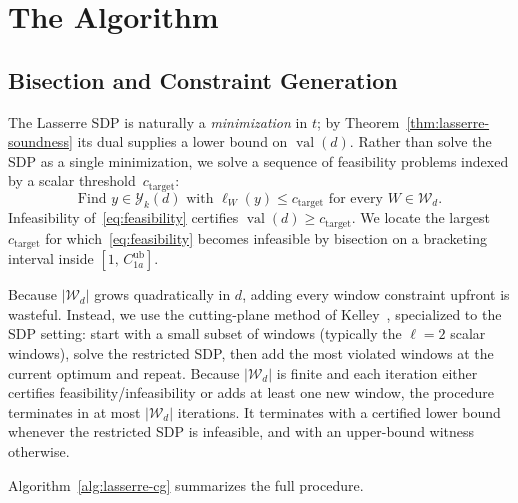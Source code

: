 \documentclass[11pt, letterpaper]{article}
\theoremstyle{paperplain}
\theoremstyle{paperdef}
\newcommand{\val}{\operatorname{val}}
\begin{document}
\section{The Algorithm}\label{sec:algorithm}

\subsection{Bisection and Constraint Generation}

The Lasserre SDP is naturally a \emph{minimization} in $t$; by
Theorem~\ref{thm:lasserre-soundness} its dual supplies a lower bound
on $\val(d)$.  Rather than solve the SDP as a single minimization, we
solve a sequence of feasibility problems indexed by a scalar
threshold~$c_{\mathrm{target}}$:
\begin{equation}\label{eq:feasibility}
  \text{Find } y\in\mathcal{Y}_k(d)\text{ with }
  \ell_W(y) \le c_{\mathrm{target}}\text{ for every }W\in\mathcal{W}_d.
\end{equation}
Infeasibility of~\eqref{eq:feasibility} certifies
$\val(d)\ge c_{\mathrm{target}}$.  We locate the largest
$c_{\mathrm{target}}$ for which~\eqref{eq:feasibility} becomes
infeasible by bisection on a bracketing interval inside
$[1,\,C_{1a}^{\mathrm{ub}}]$.

Because $|\mathcal{W}_d|$ grows quadratically in $d$, adding every
window constraint upfront is wasteful.  Instead, we use the
cutting-plane method of Kelley~\cite{Kelley1960}, specialized to the
SDP setting: start with a small subset of windows (typically the
$\ell=2$ scalar windows), solve the restricted SDP, then add the
most violated windows at the current optimum and repeat.  Because
$|\mathcal{W}_d|$ is finite and each iteration either certifies
feasibility/infeasibility or adds at least one new window, the
procedure terminates in at most $|\mathcal{W}_d|$ iterations.  It
terminates with a certified lower bound whenever the restricted SDP
is infeasible, and with an upper-bound witness otherwise.

Algorithm~\ref{alg:lasserre-cg} summarizes the full procedure.
\end{document}
